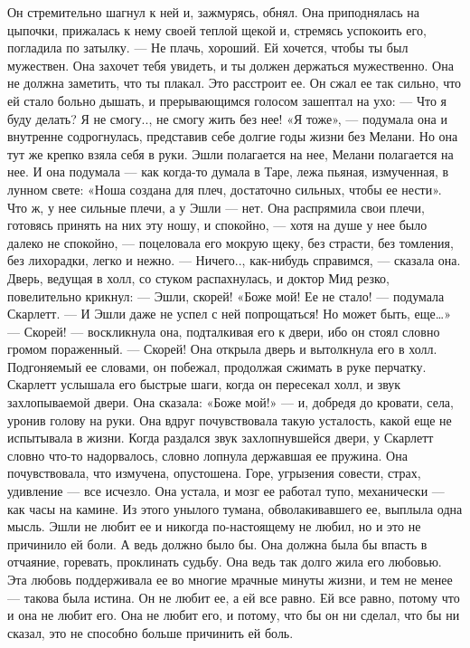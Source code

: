 Он стремительно шагнул к ней и, зажмурясь, обнял. Она приподнялась на цыпочки, прижалась к нему своей теплой щекой и, стремясь успокоить его, погладила по затылку.
— Не плачь, хороший. Ей хочется, чтобы ты был мужествен. Она захочет тебя увидеть, и ты должен держаться мужественно. Она не должна заметить, что ты плакал. Это расстроит ее.
Он сжал ее так сильно, что ей стало больно дышать, и прерывающимся голосом зашептал на ухо:
— Что я буду делать? Я не смогу.., не смогу жить без нее!
«Я тоже», — подумала она и внутренне содрогнулась, представив себе долгие годы жизни без Мелани. Но она тут же крепко взяла себя в руки. Эшли полагается на нее, Мелани полагается на нее. И она подумала — как когда-то думала в Таре, лежа пьяная, измученная, в лунном свете: «Ноша создана для плеч, достаточно сильных, чтобы ее нести». Что ж, у нее сильные плечи, а у Эшли — нет. Она распрямила свои плечи, готовясь принять на них эту ношу, и спокойно, — хотя на душе у нее было далеко не спокойно, — поцеловала его мокрую щеку, без страсти, без томления, без лихорадки, легко и нежно.
— Ничего.., как-нибудь справимся, — сказала она. Дверь, ведущая в холл, со стуком распахнулась, и доктор Мид резко, повелительно крикнул:
— Эшли, скорей!
«Боже мой! Ее не стало! — подумала Скарлетт. — И Эшли даже не успел с ней попрощаться! Но может быть, еще…» — Скорей! — воскликнула она, подталкивая его к двери, ибо он стоял словно громом пораженный. — Скорей!
Она открыла дверь и вытолкнула его в холл. Подгоняемый ее словами, он побежал, продолжая сжимать в руке перчатку. Скарлетт услышала его быстрые шаги, когда он пересекал холл, и звук захлопываемой двери.
Она сказала: «Боже мой!» — и, добредя до кровати, села, уронив голову на руки. Она вдруг почувствовала такую усталость, какой еще не испытывала в жизни. Когда раздался звук захлопнувшейся двери, у Скарлетт словно что-то надорвалось, словно лопнула державшая ее пружина. Она почувствовала, что измучена, опустошена. Горе, угрызения совести, страх, удивление — все исчезло. Она устала, и мозг ее работал тупо, механически — как часы на камине.
Из этого унылого тумана, обволакивавшего ее, выплыла одна мысль. Эшли не любит ее и никогда по-настоящему не любил, но и это не причинило ей боли. А ведь должно было бы. Она должна была бы впасть в отчаяние, горевать, проклинать судьбу. Она ведь так долго жила его любовью. Эта любовь поддерживала ее во многие мрачные минуты жизни, и тем не менее — такова была истина. Он не любит ее, а ей все равно. Ей все равно, потому что и она не любит его. Она не любит его, и потому, что бы он ни сделал, что бы ни сказал, это не способно больше причинить ей боль.
